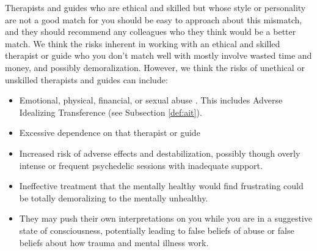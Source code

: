 \documentclass[12pt,letterpaper]{book}
\begin{document}
Therapists and guides who are ethical and skilled but whose style or personality are not a good match for you should be easy to approach about this mismatch, and they should recommend any colleagues who they think would be a better match. We think the risks inherent in working with an ethical and skilled therapist or guide who you don't match well with mostly involve wasted time and money, and possibly demoralization. However, we think the risks of unethical or unskilled therapists and guides can include:
\begin{itemize}
    \item Emotional, physical, financial, or sexual abuse \cite{powerTrip}. This includes Adverse Idealizing Transference (see Subsection \ref{def:ait}).
    \item Excessive dependence on that therapist or guide \cite{powerTrip}
    \item Increased risk of adverse effects and destabilization, possibly though overly intense or frequent psychedelic sessions with inadequate support.
    \item Ineffective treatment that the mentally healthy would find frustrating could be totally demoralizing to the mentally unhealthy.
    \item They may push their own interpretations on you while you are in a suggestive state of consciousness, potentially leading to false beliefs of abuse \cite{Scoboria07022017} or false beliefs about how trauma and mental illness work.
\end{itemize}
\label{suicideCops}
\end{document}

